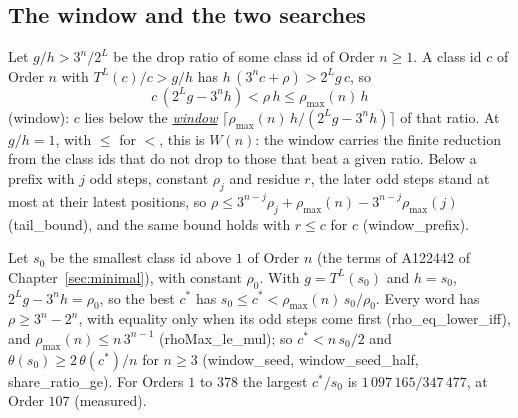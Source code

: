 \documentclass[10pt,a4paper,titlepage]{article}
\makeatletter
\newcommand{\termhere}[1]{\leavevmode
  \Hy@raisedlink{\hyper@anchorstart{term:#1}\hyper@anchorend}}
\newcommand{\keyterm}[2]{\hyperlink{box:#1}{\emph{#2}}}
\newcommand{\lean}[1]{\textsf{#1}}
\makeatother
\begin{document}
\subsection*{The window and the two searches}

\termhere{window}Let $g/h > 3^n/2^L$ be the drop ratio of some class id of Order $n \ge 1$. A class id $c$ of Order
$n$ with $T^L(c)/c > g/h$ has $h\,(3^n c + \rho) > 2^L g\,c$, so
\[
c\,(2^L g - 3^n h) < \rho\,h \le \rho_{\max}(n)\,h
\]
(\lean{window}): $c$ lies below the \keyterm{window}{window}
$\lceil \rho_{\max}(n)\,h/(2^L g - 3^n h) \rceil$ of that ratio. At $g/h = 1$, with $\le$ for $<$, this
is $W(n)$: the window carries the finite reduction from the class ids that do not drop to those
that beat a given ratio. Below a prefix with $j$ odd steps, constant $\rho_j$ and residue $r$, the later
odd steps stand at most at their latest positions, so $\rho \le 3^{n-j}\rho_j + \rho_{\max}(n) -
3^{n-j}\rho_{\max}(j)$ (\lean{tail\_bound}), and the same bound holds with $r \le c$ for $c$
(\lean{window\_prefix}).

Let $s_0$ be the smallest class id above $1$ of Order $n$ (the terms of A122442 of
Chapter~\ref{sec:minimal}), with constant $\rho_0$. With $g = T^L(s_0)$ and $h = s_0$,
$2^L g - 3^n h = \rho_0$, so the best $c^\ast$ has $s_0 \le c^\ast < \rho_{\max}(n)\,s_0/\rho_0$. Every
word has $\rho \ge 3^n - 2^n$, with equality only when its odd steps come first
(\lean{rho\_eq\_lower\_iff}), and $\rho_{\max}(n) \le n\,3^{n-1}$ (\lean{rhoMax\_le\_mul}); so
$c^\ast < n\,s_0/2$ and $\theta(s_0) \ge 2\,\theta(c^\ast)/n$ for $n \ge 3$ (\lean{window\_seed},
\lean{window\_seed\_half}, \lean{share\_ratio\_ge}). For Orders $1$ to $378$ the largest
$c^\ast/s_0$ is $1\,097\,165/347\,477$, at Order $107$ (measured).
\end{document}
